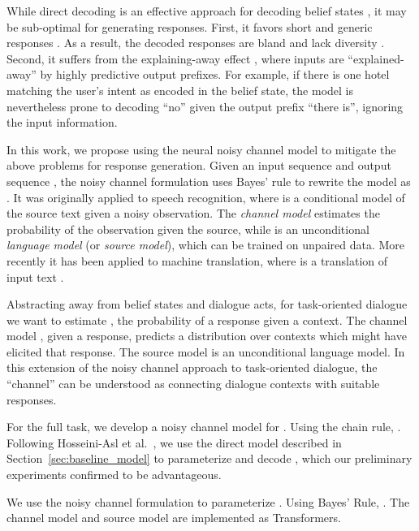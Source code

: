 \documentclass[11pt,a4paper]{article}
\begin{document}
While direct decoding is an effective approach for decoding belief states \cite{hosseini2020simple}, it may be sub-optimal for generating responses. First, it favors short and generic responses \cite{bao2020plato}. As a result, the decoded responses are bland and lack diversity \cite{li2015diversity}. Second, it suffers from the explaining-away effect \cite{klein2002conditional}, where inputs are ``explained-away'' by highly predictive output prefixes. For example, if there is one hotel matching the user's intent as encoded in the belief state, the model is nevertheless prone to decoding ``no'' given the output prefix ``there is'', ignoring the input information. 



In this work, we propose using the neural noisy channel model \cite{yu2016neural} to mitigate the above problems for response generation. Given an input sequence  and output sequence , the noisy channel formulation \cite{shannon48noisy} uses Bayes' rule to rewrite the model  as . It was originally applied to speech recognition, where  is a conditional model of the source text given a noisy observation. The {\it channel model}  estimates the probability of the observation given the source, while  is an unconditional {\it language model} (or {\it source model}), which can be trained on unpaired data. More recently it has been applied to machine translation, where  is a translation of input text .


Abstracting away from belief states and dialogue acts, for task-oriented dialogue we want to estimate , the probability of a response given a context. The channel model , given a response, predicts a distribution over contexts which might have elicited that response.
The source model  is an unconditional language model.
In this extension of the noisy channel approach to task-oriented dialogue, the ``channel'' can be understood as connecting dialogue contexts with suitable responses. 


For the full task, we develop a noisy channel model for . Using the chain rule, . Following Hosseini-Asl et al.\ , we use the direct model described in  Section~\ref{sec:baseline_model} to parameterize  and decode , which our preliminary experiments confirmed to be advantageous.

We use the noisy channel formulation to parameterize . Using Bayes' Rule, . The channel model  and source model  are implemented as Transformers.
\end{document}
